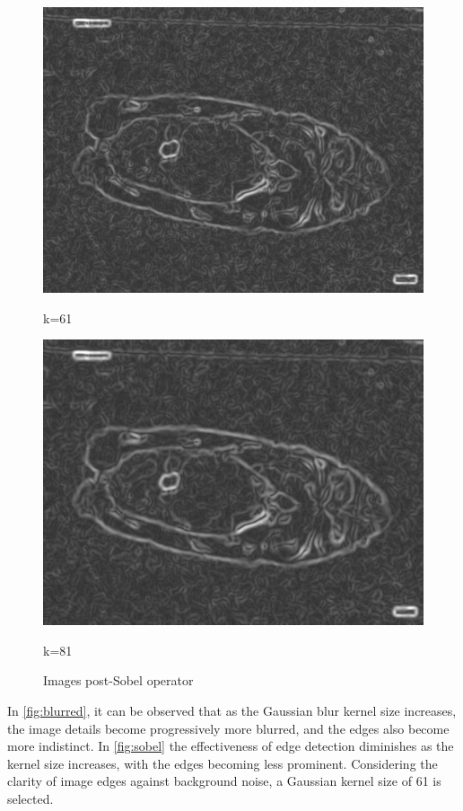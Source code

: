 \begin{figure}
\begin{minipage}{0.24\textwidth}
        \includegraphics[width=\textwidth]{./fig/gausssian/sobel61.jpg}
        \caption*{k=61}
    \end{minipage}
    \begin{minipage}{0.24\textwidth}
        \centering
        \includegraphics[width=\textwidth]{./fig/gausssian/sobel81.jpg}
        \caption*{k=81}
    \end{minipage}
    \caption{Images post-Sobel operator}
    \label{fig:sobel}
\end{figure}

In \autoref{fig:blurred}, it can be observed that as the Gaussian blur kernel size increases, the image details become progressively more blurred, and the edges also become more indistinct. In \autoref{fig:sobel} the effectiveness of edge detection diminishes as the kernel size increases, with the edges becoming less prominent. Considering the clarity of image edges against background noise, a Gaussian kernel size of 61 is selected.


